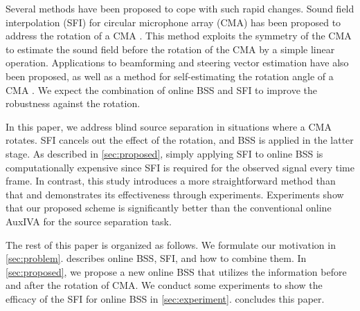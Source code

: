 \documentclass[sip,biber]{now-journal}
\begin{document}
Several methods have been proposed to cope with such rapid changes.
Sound field interpolation (SFI) for circular microphone array (CMA) has been proposed to address the rotation of a CMA \cite{Wakabayashi:2023:ASLP}.
This method exploits the symmetry of the CMA to estimate the sound field before the rotation of the CMA by a simple linear operation.
Applications to beamforming \cite{Wakabayashi:2021:ICASSP} and steering vector estimation \cite{Wakabayashi:2021:ASJ:A} have also been proposed,
as well as a method for self-estimating the rotation angle of a CMA \cite{Lian:2021:APSIPA}.
We expect the combination of online BSS and SFI to improve the robustness against the rotation.

In this paper, we address blind source separation in situations where a CMA rotates.
SFI cancels out the effect of the rotation, and BSS is applied in the latter stage.
As described in \cref{sec:proposed}, simply applying SFI to online BSS is computationally expensive since SFI is required for the observed signal every time frame.
In contrast, this study introduces a more straightforward method than that and demonstrates its effectiveness through experiments.
Experiments show that our proposed scheme is significantly better than the conventional online AuxIVA for the source separation task.

The rest of this paper is organized as follows.
We formulate our motivation in \cref{sec:problem}.
 describes online BSS, SFI, and how to combine them.
In \cref{sec:proposed}, we propose a new online BSS that utilizes the information before and after the rotation of CMA.
We conduct some experiments to show the efficacy of the SFI for online BSS in \cref{sec:experiment}.
 concludes this paper.
\end{document}
